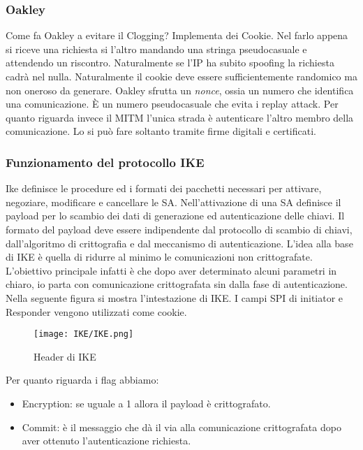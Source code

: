 \documentclass[14pt]{extreport}
\begin{document}
\subsubsection{Oakley}
Come fa Oakley a evitare il Clogging? Implementa dei Cookie. Nel farlo appena si riceve una richiesta si  l'altro mandando una stringa pseudocasuale e attendendo un riscontro. Naturalmente se l'IP ha subito spoofing la richiesta cadrà nel nulla. Naturalmente il cookie deve essere sufficientemente randomico ma non oneroso da generare.
Oakley sfrutta un \textit{nonce}, ossia un numero che identifica una comunicazione. È un numero pseudocasuale che evita i replay attack. 
Per quanto riguarda invece il MITM l'unica strada è autenticare l'altro membro della comunicazione. Lo si può fare soltanto tramite firme digitali e certificati.


\subsubsection{Funzionamento del protocollo IKE}
Ike definisce le procedure ed i formati dei pacchetti necessari per attivare, negoziare, modificare e cancellare le SA. Nell'attivazione di una SA definisce il payload per lo scambio dei dati di generazione ed autenticazione delle chiavi. Il formato del payload deve essere indipendente dal protocollo di scambio di chiavi, dall'algoritmo di crittografia e dal meccanismo di autenticazione.
L'idea alla base di IKE è quella di ridurre al minimo le comunicazioni non crittografate. L'obiettivo principale infatti è che dopo aver determinato alcuni parametri in chiaro, io parta con comunicazione crittografata sin dalla fase di autenticazione.
Nella seguente figura si mostra l'intestazione di IKE. I campi SPI di initiator e Responder vengono utilizzati come cookie.


\begin{figure}[H]
    \centering
    \texttt{[image: IKE/IKE.png]}
    \caption{Header di IKE}
    \label{ike1}
\end{figure}


Per quanto riguarda i flag abbiamo:

\begin{itemize}
    \item Encryption: se uguale a 1 allora il payload è crittografato.
    
    \item Commit: è il messaggio che dà il via alla comunicazione crittografata dopo aver ottenuto l'autenticazione richiesta.
\end{itemize}
\end{document}
